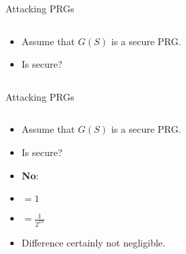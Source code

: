 \documentclass[aspectratio=169, lualatex, handout]{beamer}
\begin{document}
\begin{frame}{Attacking PRGs}
	\begin{columns}[c]
		\begin{column}{0.5\textwidth}
			\begin{itemize}
				\item Assume that $G(S)$ is a secure PRG.
				\item Is  secure?
			\end{itemize}
		\end{column}
		\begin{column}{0.5\textwidth}
		\end{column}
	\end{columns}
\end{frame}

\begin{frame}{Attacking PRGs}
	\begin{columns}[c]
		\begin{column}{0.45\textwidth}
			\begin{itemize}
				\item<1-3> Assume that $G(S)$ is a secure PRG.
				\item<1-3> Is  secure?
				\item<1-3> \textbf{No}:
				\item<1-3>  $ = 1$
				\item<2-3>  $ = \frac{1}{2^{2\lambda}}$
				\item<2-3> Difference certainly not negligible.
			\end{itemize}
		\end{column}
		\begin{column}{0.55\textwidth}
			\begin{flushright}
			\end{flushright}
		\end{column}
	\end{columns}
\end{frame}
\end{document}
